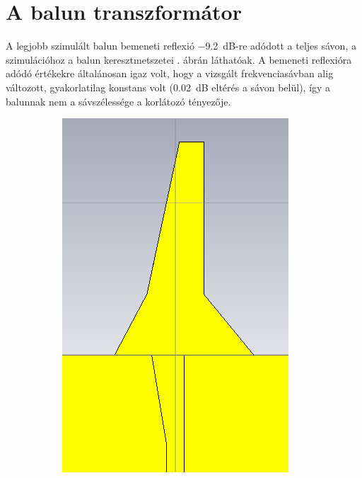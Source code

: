 \section{A balun transzformátor}
\par A legjobb szimulált balun bemeneti reflexió \SI{-9,2}{dB}-re adódott a teljes sávon, a szimulációhoz a balun keresztmetszetei . ábrán láthatóak. A bemeneti reflexióra adódó értékekre általánosan igaz volt, hogy a vizsgált frekvenciasávban alig változott, gyakorlatilag konstans volt (\SI{0,02}{dB} eltérés a sávon belül), így a balunnak nem a sávszélessége a korlátozó tényezője.
\begin{figure}[h]
	\centering
	\begin{subfigure}[b]{0.3\textwidth}
		\centering
		\includegraphics[width=\textwidth]{kep/results/balun_1.png}

\end{subfigure}
\end{figure}
